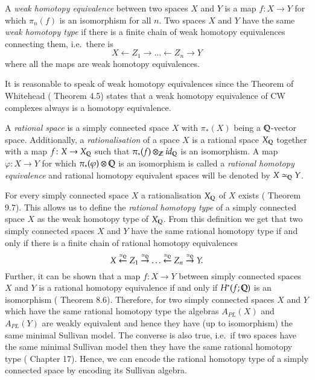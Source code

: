 \begin{Definition}
 A \emph{weak homotopy equivalence} between two spaces $X$ and $Y$ is a map $f \colon X \to Y$ for which
 $\pi_n(f)$ is an isomorphism for all $n$. Two spaces $X$ and $Y$ have the same \emph{weak homotopy type}
 if there is a finite chain of weak homotopy equivalences connecting them, i.e.\ there is
 $$ X \leftarrow Z_1 \rightarrow \ldots \leftarrow Z_n \rightarrow Y $$
 where all the maps are weak homotopy equivalences.
\end{Definition}

\begin{Remark}
 It is reasonable to speak of weak homotopy equivalences since the Theorem of Whitehead (\cite{SWB-334616069} Theorem 4.5)
 states that a weak homotopy equivalence of CW complexes always is a homotopy equivalence.
\end{Remark}


\begin{Definition}
 A \emph{rational space} is a simply connected space $X$ with $\pi_*(X)$ being a $\mathbb{Q}$-vector space.
 Additionally, a  \emph{rationalisation} of a space $X$ is a rational space $X_{\mathbb{Q}}$ together with a map
 $f \colon X \to X_{\mathbb{Q}}$ such that $\pi_*(f) \otimes_{\mathbb{Z}} id_{\mathbb{Q}}$ is an isomorphism. 
 A map $\varphi \colon X \to Y$ for which $\pi_*(\varphi) \otimes \mathbb{Q}$ is an isomorphism is 
 called a \emph{rational homotopy equivalence} and rational homotopy equivalent spaces will be denoted by
 $X \simeq_{\mathbb{Q}} Y$.
\end{Definition}

\begin{Remark}
 For every simply connected space $X$ a rationalisation $X_{\mathbb{Q}}$ of $X$ exists (\cite{Felix2001} Theorem 9.7).
 This allows us to define the \emph{rational homotopy type} of a simply connected space $X$ as the weak homotopy type of $X_{\mathbb{Q}}$.
 From this definition we get that two simply connected
 spaces $X$ and $Y$ have the same rational homotopy type if and only if there is a finite chain
 of rational homotopy equivalences
 $$ X \overset{\simeq_{\mathbb{Q}}}{\leftarrow} Z_1 \overset{\simeq_{\mathbb{Q}}}{\rightarrow} \ldots \overset{\simeq_{\mathbb{Q}}}{\leftarrow}
 Z_n \overset{\simeq_{\mathbb{Q}}}{\rightarrow} Y.$$
 Further, it can be shown that a map $f \colon X \to Y$ between simply connected spaces $X$ and $Y$
 is a rational homotopy equivalence if and only if $H^*(f;\mathbb{Q})$ 
 is an isomorphism (\cite{Felix2001} Theorem 8.6). Therefore, for two simply connected
 spaces $X$ and $Y$ which have the 
 same rational homotopy type the algebras $A_{PL}(X)$ and $A_{PL}(Y)$ are weakly equivalent and hence they 
 have (up to isomorphism) the same minimal Sullivan model. The converse is also true, i.e.\ if two
 spaces have the same minimal Sullivan model then they have the same rational homotopy type (\cite{Felix2001} Chapter 17).
 Hence, we can encode the rational homotopy type of a simply connected space by encoding its Sullivan algebra.
\end{Remark}


